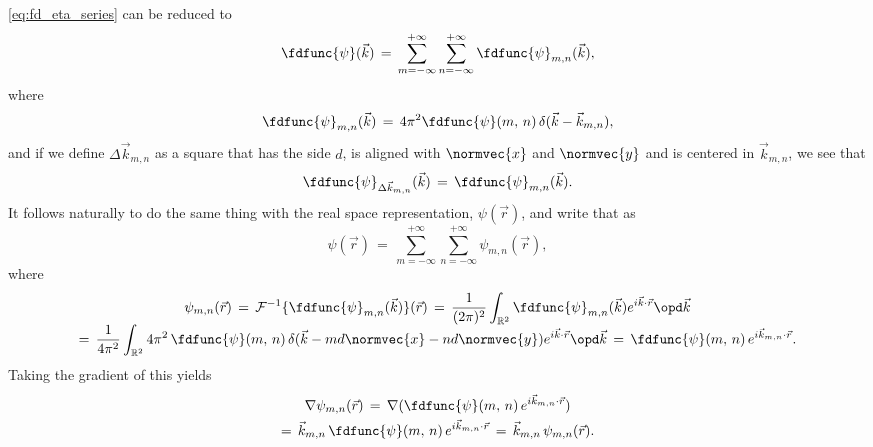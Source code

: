 \eqref{eq:fd_eta_series} can be reduced to
%
\begin{equation} \label{eq:fd_eta_series_reduced}
\fdfunc{\psi}(\vec{k}) \,=\, \sum_{m=-\infty}^{+\infty}\sum_{n=-\infty}^{+\infty} \fdfunc{\psi}_{m,n}(\vec{k}),
\end{equation}
%
where
%
\begin{equation} \label{eq:fd_eta_mn_definition}
\fdfunc{\psi}_{m,n}(\vec{k}) \,=\, 4\pi^2 \fdfunc{\psi}(m,\,n)\,\delta(\vec{k} - \vec{k}_{m,n}),
\end{equation}
%
and if we define $\Delta\vec{k}_{m,n}$ as a square that has the side $d$, is aligned with $\normvec{x}$ and $\normvec{y}$ and is centered in $\vec{k}_{m,n}$, we see that
%
\begin{equation} \label{eq:fd_eta_dk_mn_definition}
\fdfunc{\psi}_{\Delta\vec{k}_{m,n}}(\vec{k}) \,=\, \fdfunc{\psi}_{m,n}(\vec{k}).
\end{equation}
%
It follows naturally to do the same thing with the real space representation, $\psi(\vec{r})$, and write that as
%
\begin{equation} \label{eq:eta_series_reduced}
\psi(\vec{r}) \,=\, \sum_{m=-\infty}^{+\infty}\sum_{n=-\infty}^{+\infty} \psi_{m,n}(\vec{r}),
\end{equation}
%
where
%
\begin{equation} \label{eq:eta_mn_definition}
\renewcommand*{\arraystretch}{1.5}
\begin{array}{c}
\displaystyle \psi_{m,n}(\vec{r}) \,=\, \mathcal{F}^{-1}\{\fdfunc{\psi}_{m,n}(\vec{k})\}(\vec{r}) \,=\, \frac{1}{(2\pi)^2} \int_{\mathbb{R}^2} \fdfunc{\psi}_{m,n}(\vec{k}) e^{i\vec{k}\cdot\vec{r}}\opd \vec{k} \\
\displaystyle =\, \frac{1}{4\pi^2} \int_{\mathbb{R}^2} 4\pi^2\,\fdfunc{\psi}(m,\,n)\,\delta(\vec{k} - md\normvec{x} - nd\normvec{y}) e^{i\vec{k}\cdot\vec{r}}\opd \vec{k} \,=\, \fdfunc{\psi}(m,\,n)\,e^{i\vec{k}_{m,n}\cdot\vec{r}}.
\end{array}
\end{equation}
%
Taking the gradient of this yields
%
\begin{equation} \label{eq:grad_eta_one_dirac}
\renewcommand*{\arraystretch}{1.5}
\begin{array}{c}
\displaystyle \nabla\psi_{m,n}(\vec{r}) \,=\, \nabla(\fdfunc{\psi}(m,\,n)\,e^{i\vec{k}_{m,n}\cdot\vec{r}}) \\
\displaystyle =\, \vec{k}_{m,n}\,\fdfunc{\psi}(m,\,n)\,e^{i\vec{k}_{m,n}\cdot\vec{r}} \,=\, \vec{k}_{m,n}\,\psi_{m,n}(\vec{r}).
\end{array}
\end{equation}

